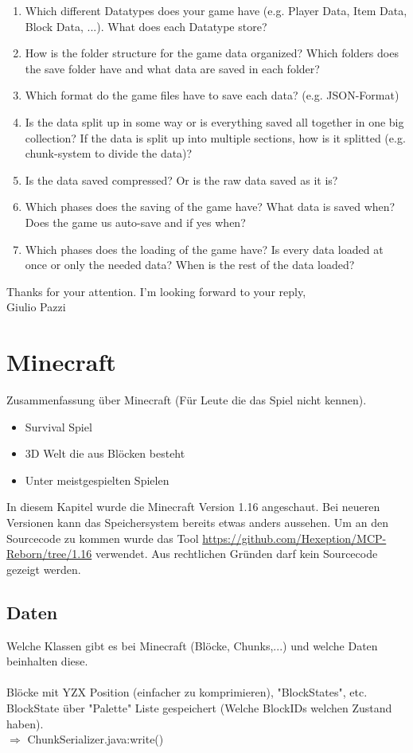 \begin{enumerate}
    \item Which different Datatypes does your game have (e.g. Player Data, Item Data, Block Data, ...). What does each Datatype store?
    \item How is the folder structure for the game data organized? Which folders does the save folder have and what data are saved in each folder?
    \item Which format do the game files have to save each data? (e.g. JSON-Format)
    \item Is the data split up in some way or is everything saved all together in one big collection? If the data is split up into multiple sections, how is it splitted (e.g. chunk-system to divide the data)?
    \item Is the data saved compressed? Or is the raw data saved as it is?
    \item Which phases does the saving of the game have? What data is saved when? Does the game us auto-save and if yes when?
    \item Which phases does the loading of the game have? Is every data loaded at once or only the needed data? When is the rest of the data loaded?
\end{enumerate}

Thanks for your attention. I’m looking forward to your reply,\\
Giulio Pazzi

\section{Minecraft}
Zusammenfassung über Minecraft (Für Leute die das Spiel nicht kennen).
\begin{itemize}
    \item Survival Spiel
    \item 3D Welt die aus Blöcken besteht
    \item Unter meistgespielten Spielen
\end{itemize}

In diesem Kapitel wurde die Minecraft Version 1.16 angeschaut. 
Bei neueren Versionen kann das Speichersystem bereits etwas anders aussehen. Um an den Sourcecode zu kommen wurde das Tool 
\url{https://github.com/Hexeption/MCP-Reborn/tree/1.16} verwendet. Aus rechtlichen Gründen darf kein
Sourcecode gezeigt werden.

\subsection{Daten}
Welche Klassen gibt es bei Minecraft (Blöcke, Chunks,...) und welche Daten 
beinhalten diese.\\
\\
Blöcke mit YZX Position (einfacher zu komprimieren), "BlockStates", etc.\\
BlockState über "Palette" Liste gespeichert (Welche BlockIDs welchen Zustand haben).\\
$\Rightarrow{}$ ChunkSerializer.java:write()\\

